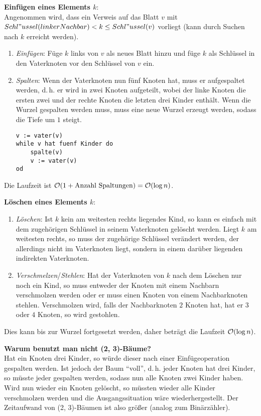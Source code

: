 \textbf{Einfügen eines Elements $k$}: \\
Angenommen wird, dass ein Verweis auf das Blatt $v$ mit
$Schl"ussel(linkerNachbar) < k \le Schl"ussel(v)$ vorliegt
(kann durch Suchen nach $k$ erreicht werden).
\begin{enumerate}
    \item
    \emph{Einfügen}:
    Füge $k$ links von $v$ als neues Blatt hinzu und füge $k$ als Schlüssel
    in den Vaterknoten vor den Schlüssel von $v$ ein.

    \item
    \emph{Spalten}:
    Wenn der Vaterknoten nun fünf Knoten hat, muss er aufgespaltet werden,
    d.\,h. er wird in zwei Knoten aufgeteilt, wobei der linke
    Knoten die ersten zwei und der rechte Knoten die letzten drei
    Kinder enthält.
    Wenn die Wurzel gespalten werden muss, muss eine neue Wurzel erzeugt
    werden, sodass die Tiefe um $1$ steigt.
    \begin{lstlisting}
v := vater(v)
while v hat fuenf Kinder do
    spalte(v)
    v := vater(v)
od
    \end{lstlisting}
\end{enumerate}
Die Laufzeit ist $\mathcal{O}(1 + \text{Anzahl Spaltungen}) = \mathcal{O}(\log n)$.

\linie

\textbf{Löschen eines Elements $k$}:
\begin{enumerate}
    \item
    \emph{Löschen}:
    Ist $k$ kein am weitesten rechts liegendes Kind, so kann es einfach
    mit dem zugehörigen Schlüssel in seinem Vaterknoten gelöscht werden.
    Liegt $k$ am weitesten rechts, so muss der zugehörige Schlüssel
    verändert werden, der allerdings nicht im Vaterknoten liegt, sondern
    in einem darüber liegenden indirekten Vaterknoten.

    \item
    \emph{Verschmelzen}/\emph{Stehlen}:
    Hat der Vaterknoten von $k$ nach dem Löschen nur noch ein Kind, so
    muss entweder der Knoten mit einem Nachbarn verschmolzen werden oder
    er muss einen Knoten von einem Nachbarknoten stehlen.
    Verschmolzen wird, falls der Nachbarknoten $2$ Knoten hat, hat er
    $3$ oder $4$ Knoten, so wird gestohlen.
\end{enumerate}
Dies kann bis zur Wurzel fortgesetzt werden, daher beträgt die Laufzeit
$\mathcal{O}(\log n)$.

\linie

\textbf{Warum benutzt man nicht (2, 3)-Bäume?} \\
Hat ein Knoten drei Kinder, so würde dieser nach einer Einfügeoperation
gespalten werden.
Ist jedoch der Baum "`voll"', d.\,h. jeder Knoten hat drei Kinder,
so müsste jeder gespalten werden, sodass nun alle Knoten zwei Kinder haben.
Wird nun wieder ein Knoten gelöscht, so müssten wieder alle Kinder verschmolzen
werden und die Ausgangssituation wäre wiederhergestellt.
Der Zeitaufwand von (2, 3)-Bäumen ist also größer
(analog zum Binärzähler).


